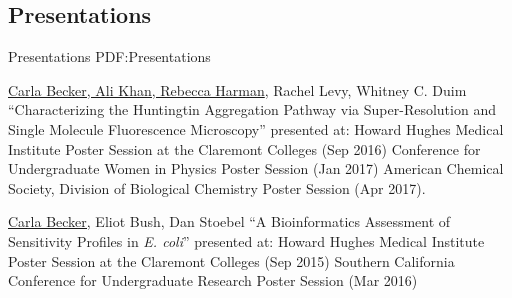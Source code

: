\documentclass[letterpaper,10pt,oneside]{article}
\begin{document}
\begin{body}

\section
{Presentations}
{Presentations}
{PDF:Presentations}

\SubBulletItem
\underline{Carla Becker, Ali Khan, Rebecca Harman}, Rachel Levy, Whitney C. Duim 
\SubBulletItem
“Characterizing the Huntingtin Aggregation Pathway via Super-Resolution and Single Molecule Fluorescence Microscopy” presented at:
\SubBulletItemBullet
Howard Hughes Medical Institute Poster Session at the Claremont Colleges (Sep 2016)
\SubBulletItemBullet Conference for Undergraduate Women in Physics Poster Session (Jan 2017)
\SubBulletItemBullet American Chemical Society, Division of Biological Chemistry Poster Session (Apr 2017).

\Gap
\SubBulletItem
\underline{Carla Becker,} Eliot Bush, Dan Stoebel
\SubBulletItem
“A Bioinformatics Assessment of Sensitivity Profiles in {\it E. coli}” presented at:
\SubBulletItemBullet Howard Hughes Medical Institute Poster Session at the Claremont Colleges (Sep 2015) 
\SubBulletItemBullet Southern California Conference for Undergraduate Research Poster Session (Mar 2016)

\end{body}
\thispagestyle{empty}



\end{document}
